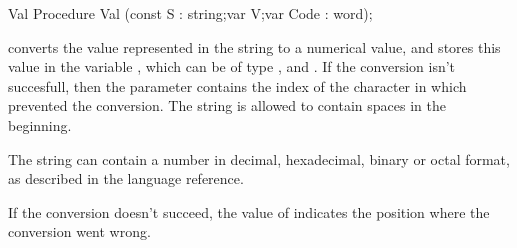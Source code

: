 
\begin{procedure}{Val}
\Declaration
Procedure Val (const S : string;var V;var Code : word);

\Description
{} converts the value represented in the string  to a numerical
value, and stores this value in the variable , which
can be of type ,  and .
If the conversion isn't succesfull, then the parameter  contains
the index of the character in  which prevented the conversion.
The string  is allowed to contain spaces in the beginning.

The string  can contain a number in decimal, hexadecimal, binary
or octal format, as described in the language reference.

\Errors
If the conversion doesn't succeed, the value of  indicates the
position where the conversion went wrong.
\SeeAlso
{}
\end{procedure}


